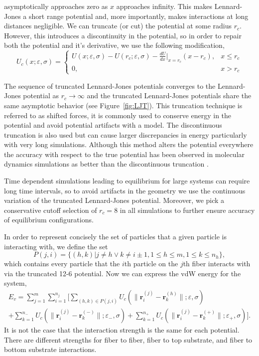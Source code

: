 \noindent	
asymptotically approaches zero as $x$ approaches infinity. This makes Lennard-Jones a short range potential and, more importantly, makes interactions at long distances negligible. We can truncate (or cut) the potential at some radius $r_c$. However, this introduces a discontinuity in the potential, so in order to repair both the potential and it's derivative, we use the following modification,
\begin{equation}
	U_c(x; \varepsilon, \sigma) = \left\{ 
		\begin{array}{lr}
			U(x; \varepsilon, \sigma) - U(r_c; \varepsilon, \sigma) - \frac{dU}{dx}\bigg|_{x = r_c}(x - r_c), & x \leq r_c\\
			0, & x > r_c
		\end{array}
		\right. 
\end{equation}

	The sequence of truncated Lennard-Jones potentials converges to the Lennard-Jones potential as $r_c \to \infty$ and the truncated Lennard-Jones potentials share the same asymptotic behavior (see Figure~\ref{fig:LJT}). This truncation technique is referred to as shifted forces, it is commonly used to conserve energy in the potential and avoid potential artifacts with a model. The discontinuous truncation is also used but can cause larger discrepancies in energy particularly with very long simulations. Although this method alters the potential everywhere the accuracy with respect to the true potential has been observed in molecular dynamics simulations as better than the discontinuous truncation \cite{Toxvaerd2011}.
	
  Time dependent simulations leading to equilibrium for large systems can require long time intervals, so to avoid artifacts in the geometry we use the continuous variation of the truncated Lennard-Jones potential. Moreover, we pick a conservative cutoff selection of $r_c = 8$ in all simulations to further ensure accuracy of equilibrium configurations.

	In order to represent concisely the set of particles that a given particle is interacting with, we define the set
\begin{equation}
	P(j,i) = \{ (h,k)|j \neq h \vee k \neq i \pm 1, 1 \leq h \leq m, 1 \leq k \leq n_h \},
\end{equation}
which contains every particle that the $i$th particle on the $j$th fiber interacts with via the truncated 12-6 potential. Now we can express the vdW energy for the system,
\begin{multline}
	E_v = \sum_{j=1}^m \sum_{i=1}^{n_j} \bigg[ \sum_{(h,k) \in P(j,i)} U_c \left( \| \textbf{r}_i^{(j)} - \textbf{r}_k^{(h)} \|; \varepsilon, \sigma \right) \\ + \sum_{k=1}^{n_-} U_c \left( \| \textbf{r}_i^{(j)} - \textbf{r}_k^{(-)} \|; \varepsilon_-, \sigma \right) + \sum_{k=1}^{n_+} U_c \left( \| \textbf{r}_i^{(j)} - \textbf{r}_k^{(+)} \|; \varepsilon_+, \sigma \right) \bigg].
\end{multline}
It is not the case that the interaction strength is the same for each potential. There are different strengths for fiber to fiber, fiber to top substrate, and fiber to bottom substrate interactions.


